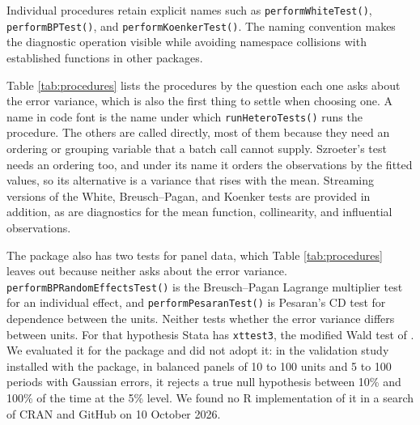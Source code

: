 Individual procedures retain explicit names such as \texttt{performWhiteTest()},
\texttt{performBPTest()}, and \texttt{performKoenkerTest()}. The naming convention makes
the diagnostic operation visible while avoiding namespace collisions with
established functions in other packages.

Table \ref{tab:procedures} lists the procedures by the question each one asks
about the error variance, which is also the first thing to settle when
choosing one. A name in code font is the name under which \texttt{runHeteroTests()}
runs the procedure. The others are called directly, most of them because they
need an ordering or grouping variable that a batch call cannot supply.
Szroeter's test needs an ordering too, and under its name it orders the
observations by the fitted values, so its alternative is a variance that rises
with the mean. Streaming versions of the White, Breusch--Pagan, and Koenker
tests are provided in addition, as are diagnostics for the mean function,
collinearity, and influential observations.

The package also has two tests for panel data, which Table
\ref{tab:procedures} leaves out because neither asks about the error
variance. \texttt{performBPRandomEffectsTest()} is the Breusch--Pagan Lagrange
multiplier test for an individual effect, and \texttt{performPesaranTest()} is
Pesaran's CD test for dependence between the units. Neither tests whether the
error variance differs between units. For that hypothesis Stata has
\texttt{xttest3}, the modified Wald test of \citet{baum2001residual}. We evaluated it for
the package and did not adopt it: in the validation study installed with the
package, in balanced panels of 10 to 100 units
and 5 to 100 periods with Gaussian errors,
it rejects a true null hypothesis between 10\% and
100\% of the time at the 5\% level. We found no R
implementation of it in a search of CRAN and GitHub on 10 October 2026.

